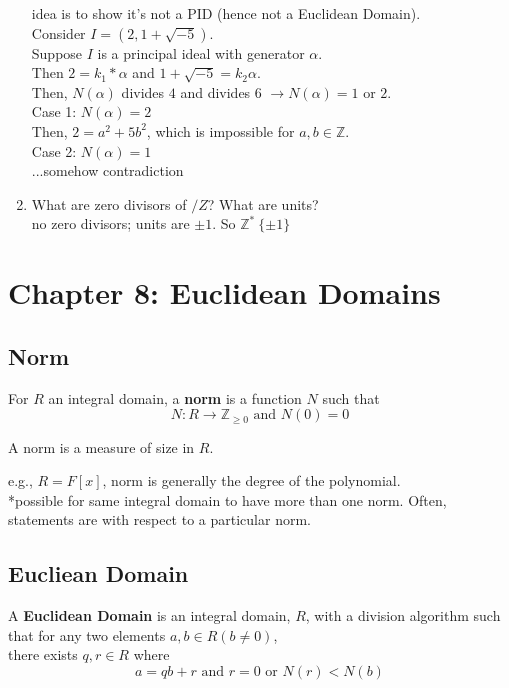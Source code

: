 \documentclass[12pt]{article}
\def\Z{\ensuremath{\mathbb{Z}}}
\newcommand{\gray}[1]{\textcolor[gray]{0.5}{#1}} %
\begin{document}
\begin{enumerate}
\textcolor[gray]{0.5}{idea is to show it's not a PID (hence not a Euclidean Domain).\\
Consider $I = (2, 1 + \sqrt{-5})$.\\
Suppose $I$ is a principal ideal with generator $\alpha$.\\
Then $ 2 = k_1* \alpha$ and $1 + \sqrt{-5} = k_2 \alpha$.\\
Then, $N(\alpha)$ divides $4$ and divides $6$ $\rightarrow N(\alpha) = 1 \text{ or } 2.$ \\
Case 1: $N(\alpha) = 2$\\
Then, $2 = a^2 + 5 b^2$, which is impossible for $a, b \in \mathbb{Z}$.\\
Case 2: $N(\alpha) = 1$\\
...somehow contradiction
}

\item What are zero divisors of $/Z$? What are units?\\
\gray{no zero divisors; units are $\pm 1$. So $\Z^* \ \{\pm 1\}$}

\end{enumerate}


\section*{Chapter 8: Euclidean Domains}
\subsection*{Norm}

For $R$ an integral domain, a \textbf{norm} is a function $N$ such that
$$N: R \rightarrow \mathbb{Z}_{\geq 0} \text{ and } N(0) = 0$$

A norm is a measure of size in $R$.

e.g., $R = F[x]$, norm is generally the degree of the polynomial.\\

*possible for same integral domain to have more than one norm. Often, statements are with respect to a particular norm.\\

\subsection*{Eucliean Domain}

A \textbf{Euclidean Domain} is an integral domain, $R$, with a division algorithm such that for any two elements $a, b \in R (b \neq 0)$,\\
there exists $q, r \in R$ where 
$$a = qb + r \text{ and } r = 0 \text{ or } N(r) < N(b)$$
\end{document}
